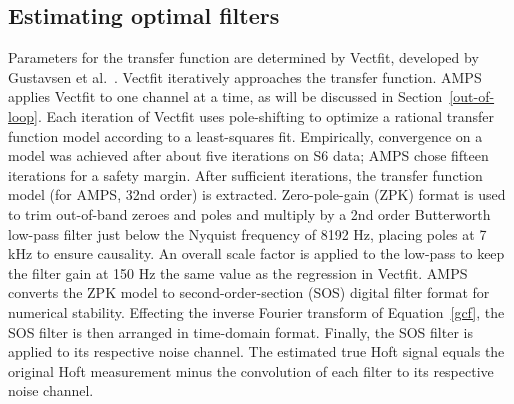%
%
%
%
%
%
%
        \subsection{Estimating optimal filters}
        \label{filter_est}

	Parameters for the transfer function are determined by Vectfit, developed by Gustavsen et al.~\cite{Deschrijver2008,Gustavsen2006,Gustavsen1999}. Vectfit iteratively approaches the transfer function. AMPS applies Vectfit to one channel at a time, as will be discussed in Section~\ref{out-of-loop}. Each iteration of Vectfit uses pole-shifting to optimize a rational transfer function model according to a least-squares fit. Empirically, convergence on a model was achieved after about five iterations on S6 data; AMPS chose fifteen iterations for a safety margin. After sufficient iterations, the transfer function model (for AMPS, 32nd order) is extracted. Zero-pole-gain (ZPK) format is used to trim out-of-band zeroes and poles and multiply by a 2nd order Butterworth low-pass filter just below the Nyquist frequency of 8192 Hz, placing poles at 7 kHz to ensure causality. An overall scale factor is applied to the low-pass to keep the filter gain at 150 Hz the same value as the regression in Vectfit. AMPS converts the ZPK model to second-order-section (SOS) digital filter format for numerical stability. Effecting the inverse Fourier transform of Equation~\ref{gcf}, the SOS filter is then arranged in time-domain format. Finally, the SOS filter is applied to its respective noise channel. The estimated true Hoft signal equals the original Hoft measurement minus the convolution of each filter to its respective noise channel. 

